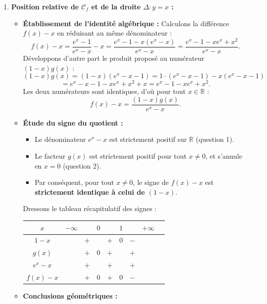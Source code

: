 \documentclass[11pt,a4paper]{article}
\newcommand{\R}{\mathbb{R}}
\begin{document}
\begin{correctionbox}[Exercice 7]
\begin{enumerate}[label=\textbf{\arabic*.}]
    \item \textbf{Position relative de $\mathcal{C}_f$ et de la droite $\Delta : y = x$ :}
    \begin{itemize}
        \item \textbf{Établissement de l'identité algébrique :}
        Calculons la différence $f(x) - x$ en réduisant au même dénominateur :
        \[
        f(x) - x = \frac{e^x - 1}{e^x - x} - x = \frac{e^x - 1 - x(e^x - x)}{e^x - x} = \frac{e^x - 1 - x e^x + x^2}{e^x - x}.
        \]
        Développons d'autre part le produit proposé au numérateur $(1 - x)g(x)$ :
        \[
        (1 - x)g(x) = (1 - x)(e^x - x - 1) = 1 \cdot (e^x - x - 1) - x(e^x - x - 1)
        \]
        \[
        = e^x - x - 1 - x e^x + x^2 + x = e^x - 1 - x e^x + x^2.
        \]
        Les deux numérateurs sont identiques, d'où pour tout $x \in \R$ :
        \[
        \boxed{f(x) - x = \frac{(1 - x)g(x)}{e^x - x}}.
        \]
        \item \textbf{Étude du signe du quotient :}
        \begin{itemize}
            \item Le dénominateur $e^x - x$ est strictement positif sur $\R$ (question 1).
            \item Le facteur $g(x)$ est strictement positif pour tout $x \neq 0$, et s'annule en $x = 0$ (question 2).
            \item Par conséquent, pour tout $x \neq 0$, le signe de $f(x) - x$ est \textbf{strictement identique à celui de $(1 - x)$}.
        \end{itemize}
        Dressons le tableau récapitulatif des signes :
        \begin{center}
        \begin{tabular}{|c|lccccccr|}
        \hline
        $x$ & $-\infty$ & & $0$ & & $1$ & & $+\infty$ \\
        \hline
        $1 - x$ & & $+$ & \vline & $+$ & $0$ & $-$ & \\
        \hline
        $g(x)$ & & $+$ & $0$ & $+$ & \vline & $+$ & \\
        \hline
        $e^x - x$ & & $+$ & \vline & $+$ & \vline & $+$ & \\
        \hline
        $f(x) - x$ & & $+$ & $0$ & $+$ & $0$ & $-$ & \\
        \hline
        \end{tabular}
        \end{center}
        \item \textbf{Conclusions géométriques :}

\end{itemize}
\end{enumerate}
\end{correctionbox}
\end{document}
